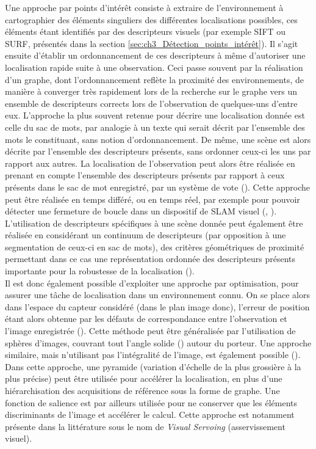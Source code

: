 Une approche par points d'intérêt consiste à extraire de l'environnement à cartographier des éléments singuliers des différentes localisations possibles, ces éléments étant identifiés par des descripteurs visuels (par exemple SIFT ou SURF, présentés dans la section \ref{sec:ch3_Détection_points_intérêt}). Il s'agit ensuite d'établir un ordonnancement de ces descripteurs à même d'autoriser une localisation rapide suite à une observation. Ceci passe souvent par la réalisation d'un graphe, dont l'ordonnancement reflète la proximité des environnements, de manière à converger très rapidement lors de la recherche sur le graphe vers un ensemble de descripteurs corrects lors de l'observation de quelques-uns d'entre eux. L'approche la plus souvent retenue pour décrire une localisation donnée est celle du \og sac de mots\fg{}, par analogie à un texte qui serait décrit par l'ensemble des mots le constituant, sans notion d'ordonnancement. De même, une scène est alors décrite par l'ensemble des descripteurs présents, sans ordonner ceux-ci les uns par rapport aux autres. La localisation de l'observation peut alors être réalisée en prenant en compte l'ensemble des descripteurs présents par rapport à ceux présents dans le \og sac de mot\fg{} enregistré, par un système de vote (\cite{Filliat2007}). Cette approche peut être réalisée en temps différé, ou en temps réel, par exemple pour pouvoir détecter une fermeture de boucle dans un dispositif de SLAM visuel (\cite{Mei}, \cite{Mei2010}). L'utilisation de descripteurs spécifiques à une scène donnée peut également être réalisée en considérant un continuum de descripteurs (par opposition à une segmentation de ceux-ci en \og sac de mots\fg{}), des critères géométriques de proximité permettant dans ce cas une représentation ordonnée des descripteurs présents importante pour la robustesse de la localisation (\cite{Sinha2012}). \\

Il est donc également possible d'exploiter une approche par optimisation, pour assurer une tâche de localisation  dans un environnement connu. On se place alors dans l'espace du capteur considéré (dans le plan image donc), l'erreur de position étant alors obtenue  par les défauts de correspondance entre l'observation et l'image enregistrée (\cite{Cherubini2010}). Cette méthode peut être généralisée par l'utilisation de sphères d'images, couvrant tout l'angle solide (\cite{Meilland2011}) autour du porteur. Une approche similaire, mais n'utilisant pas l'intégralité de l'image, est également possible (\cite{Dayoub}). Dans cette approche, une pyramide (variation d'échelle de la plus grossière à la plus précise) peut être utilisée pour accélérer la localisation, en plus d'une hiérarchisation des acquisitions de référence sous la forme de graphe. Une fonction de salience est par ailleurs utilisée pour ne conserver que les éléments discriminants de l'image et accélérer le calcul. Cette approche est notamment présente dans la littérature sous le nom de \textit{Visual Servoing} (asservissement visuel).

